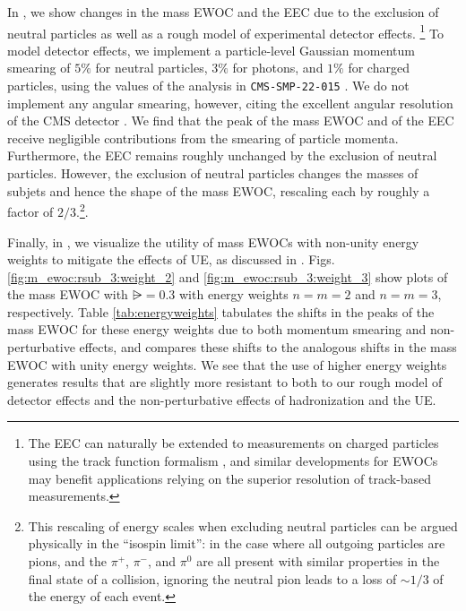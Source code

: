 In , we show changes in the mass EWOC and the EEC due to the exclusion of neutral particles as well as a rough model of experimental detector effects.%
\footnote{
    The EEC can naturally be extended to measurements on charged particles using the track function formalism \cite{Chang:2013rca,Chang:2013iba,Chen:2020vvp,Li:2021zcf,SchrijndervanVelzen:2022ftm,Jaarsma:2022kdd,Lee:2023xzv,Jaarsma:2023ell,Barata:2024nqo}, and similar developments for EWOCs may benefit applications relying on the superior resolution of track-based measurements.
}
%
To model detector effects, we implement a particle-level Gaussian momentum smearing of \(5\%\) for neutral particles, \(3\%\) for photons, and \(1\%\) for charged particles, using the values of the analysis in \texttt{CMS-SMP-22-015} \cite{CMS:2024mlf}.
%
We do not implement any angular smearing, however, citing the excellent angular resolution of the CMS detector \cite{CMS:2024mlf,Holguin:2024tkz}.
%
We find that the peak of the mass EWOC and of the EEC receive negligible contributions from the smearing of particle momenta.
%
Furthermore, the EEC remains roughly unchanged by the exclusion of neutral particles.
%
However, the exclusion of neutral particles changes the masses of subjets and hence the shape of the mass EWOC, rescaling each by roughly a factor of \(2/3\).\footnote{
    This rescaling of energy scales when excluding neutral particles can be argued physically in the ``isospin limit'':
    in the case where all outgoing particles are pions, and the \(\pi^+\), \(\pi^-\), and \(\pi^0\) are all present with similar properties in the final state of a collision, ignoring the neutral pion leads to a loss of \(\sim 1/3\) of the energy of each event.
}.




Finally, in , we visualize the utility of mass EWOCs with non-unity energy weights to mitigate the effects of UE, as discussed in .
%
Figs. \ref{fig:m_ewoc:rsub_3:weight_2} and \ref{fig:m_ewoc:rsub_3:weight_3} show plots of the mass EWOC with \(\rsub = 0.3\) with energy weights \(n = m = 2\) and \(n = m = 3\), respectively.
%
Table \ref{tab:energyweights} tabulates the shifts in the peaks of the mass EWOC for these energy weights due to both momentum smearing and non-perturbative effects, and compares these shifts to the analogous shifts in the mass EWOC with unity energy weights.
%
We see that the use of higher energy weights generates results that are slightly more resistant to both to our rough model of detector effects and the non-perturbative effects of hadronization and the UE.

